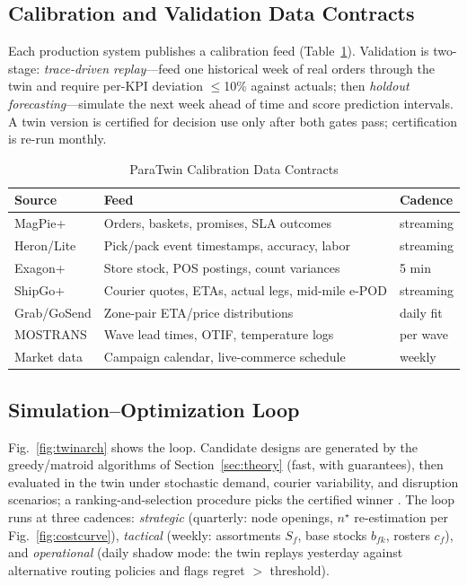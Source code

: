 \documentclass[journal]{IEEEtran}
\begin{document}
\subsection{Calibration and Validation Data Contracts}
Each production system publishes a calibration feed (Table~\ref{tab:contracts}). Validation is two-stage: \emph{trace-driven replay}---feed one historical week of real orders through the twin and require per-KPI deviation $\le$10\% against actuals; then \emph{holdout forecasting}---simulate the next week ahead of time and score prediction intervals. A twin version is certified for decision use only after both gates pass; certification is re-run monthly.

\begin{table}[!t]
\caption{ParaTwin Calibration Data Contracts}
\label{tab:contracts}
\centering
\scriptsize
\begin{tabularx}{\columnwidth}{@{}l X l@{}}
\toprule
\textbf{Source} & \textbf{Feed} & \textbf{Cadence} \\
\midrule
MagPie+ & Orders, baskets, promises, SLA outcomes & streaming \\
Heron/Lite & Pick/pack event timestamps, accuracy, labor & streaming \\
Exagon+ & Store stock, POS postings, count variances & 5 min \\
ShipGo+ & Courier quotes, ETAs, actual legs, mid-mile e-POD & streaming \\
Grab/GoSend & Zone-pair ETA/price distributions & daily fit \\
MOSTRANS & Wave lead times, OTIF, temperature logs & per wave \\
Market data & Campaign calendar, live-commerce schedule & weekly \\
\bottomrule
\end{tabularx}
\end{table}

\subsection{Simulation--Optimization Loop}
Fig.~\ref{fig:twinarch} shows the loop. Candidate designs are generated by the greedy/matroid algorithms of Section~\ref{sec:theory} (fast, with guarantees), then evaluated in the twin under stochastic demand, courier variability, and disruption scenarios; a ranking-and-selection procedure picks the certified winner \cite{snoeck,law}. The loop runs at three cadences: \emph{strategic} (quarterly: node openings, $n^\star$ re-estimation per Fig.~\ref{fig:costcurve}), \emph{tactical} (weekly: assortments $S_f$, base stocks $b_{fk}$, rosters $c_f$), and \emph{operational} (daily shadow mode: the twin replays yesterday against alternative routing policies and flags regret $>$ threshold).
\end{document}
